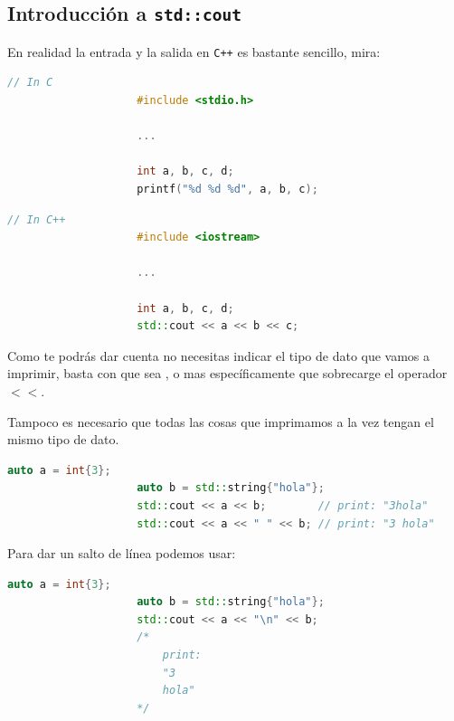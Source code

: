 \documentclass[12pt, fleqn]{report}                             %
\newcommand \Quote              {\qq}                           %
\theoremstyle{break}                                            %
\newcommand{\textCode}[1]  { \texttt{#1} }                      %
\newcommand{\Cpp}{\ignorespaces\textCode{C++}}                  %
\begin{document}
            \subsection{Introducción a \textCode{std::cout}}
                
                En realidad la entrada y la salida en \Cpp es bastante sencillo, mira:
                \begin{lstlisting}[language=C++, gobble=20]
                    // In C
                    #include <stdio.h>

                    ...

                    int a, b, c, d;
                    printf("%d %d %d", a, b, c); 
                \end{lstlisting}

                \begin{lstlisting}[language=C++, gobble=20]
                    // In C++
                    #include <iostream>

                    ...

                    int a, b, c, d;
                    std::cout << a << b << c;
                \end{lstlisting}


                Como te podrás dar cuenta no necesitas indicar el tipo de dato que vamos a imprimir, 
                basta con que sea \Quote{imprimible}, o mas específicamente que sobrecarge el operador
                $<<$.
                
                Tampoco es necesario que todas las cosas que imprimamos a la vez tengan el mismo tipo de dato.
                \begin{lstlisting}[language=C++, gobble=20]
                    auto a = int{3};
                    auto b = std::string{"hola"};
                    std::cout << a << b;        // print: "3hola"
                    std::cout << a << " " << b; // print: "3 hola"
                \end{lstlisting}

                Para dar un salto de línea podemos usar:
                \begin{lstlisting}[language=C++, gobble=20]
                    auto a = int{3};
                    auto b = std::string{"hola"};
                    std::cout << a << "\n" << b;        
                    /*
                        print:
                        "3
                        hola"
                    */

                \end{lstlisting}
\end{document}
